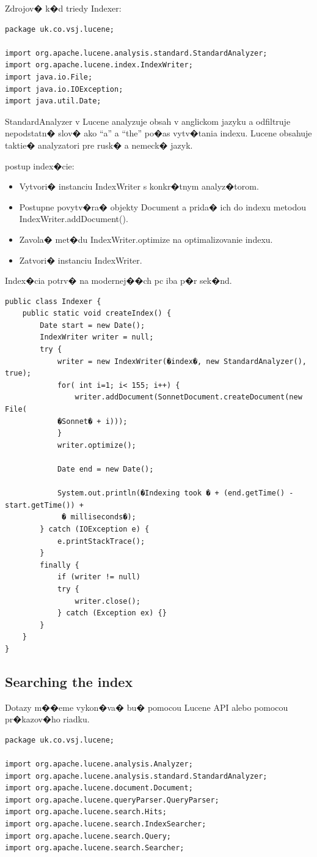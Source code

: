 \documentclass[11pt,a4paper]{article}
\begin{document}
Zdrojov� k�d triedy Indexer:

\begin{verbatim}
package uk.co.vsj.lucene;

import org.apache.lucene.analysis.standard.StandardAnalyzer;
import org.apache.lucene.index.IndexWriter;
import java.io.File;
import java.io.IOException;
import java.util.Date;
\end{verbatim}

StandardAnalyzer v Lucene analyzuje obsah v anglickom jazyku a odfiltruje nepodstatn� slov� ako ``a'' a ``the'' po�as vytv�tania indexu. Lucene obsahuje taktie� analyzatori pre rusk� a nemeck� jazyk.

postup index�cie:
\begin{itemize}
\item Vytvori� instanciu IndexWriter s konkr�tnym analyz�torom.
\item Postupne povytv�ra� objekty Document a prida� ich do indexu metodou IndexWriter.addDocument().
\item Zavola� met�du IndexWriter.optimize na optimalizovanie indexu.
\item Zatvori� instanciu IndexWriter.
\end{itemize}

Index�cia potrv� na modernej��ch pc iba p�r sek�nd.

\begin{verbatim}
public class Indexer {
	public static void createIndex() {
		Date start = new Date();
		IndexWriter writer = null;
		try {
			writer = new IndexWriter(�index�, new StandardAnalyzer(), true);
			for( int i=1; i< 155; i++) {
				writer.addDocument(SonnetDocument.createDocument(new File(
			�Sonnet� + i)));
			}
			writer.optimize();

			Date end = new Date();

			System.out.println(�Indexing took � + (end.getTime() - start.getTime()) +
			 � milliseconds�);
		} catch (IOException e) {
			e.printStackTrace();
		}
		finally {
			if (writer != null)
			try {
				writer.close();
			} catch (Exception ex) {}
		}
	}
}
\end{verbatim}

\subsection{Searching the index}
Dotazy m��eme vykon�va� bu� pomocou Lucene API alebo pomocou pr�kazov�ho riadku.

\begin{verbatim}
package uk.co.vsj.lucene;

import org.apache.lucene.analysis.Analyzer;
import org.apache.lucene.analysis.standard.StandardAnalyzer;
import org.apache.lucene.document.Document;
import org.apache.lucene.queryParser.QueryParser;
import org.apache.lucene.search.Hits;
import org.apache.lucene.search.IndexSearcher;
import org.apache.lucene.search.Query;
import org.apache.lucene.search.Searcher;
\end{verbatim}
\end{document}
